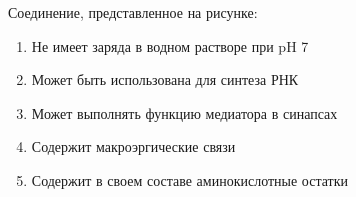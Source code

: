 
Соединение, представленное на рисунке:


\begin{enumerate}
    \item Не имеет заряда в водном растворе при pH 7
    \item Может быть использована для синтеза РНК
    \item Может выполнять функцию медиатора в синапсах 
    \item Содержит макроэргические связи 
    \item Содержит в своем составе аминокислотные остатки
\end{enumerate}


\explanationSection

